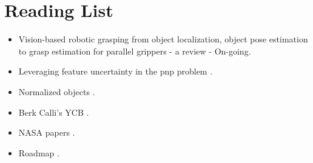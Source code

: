 \documentclass[11pt]{article}
\begin{document}
\section{Reading List}
\begin{itemize}
      \item Vision-based robotic grasping from object localization, object pose estimation to grasp estimation for parallel grippers - a review \cite{du2020vision} - On-going.
      \item Leveraging feature uncertainty in the pnp problem \cite{ferraz2014leveraging}.
      \item Normalized objects \cite{Wang_2019_CVPR}.
      \item Berk Calli's YCB \cite{calli2015ycb}.
      \item NASA papers \cite{NASATech44:online}.
      \item Roadmap \cite{roadmap251:online}.
\end{itemize}
\end{document}
